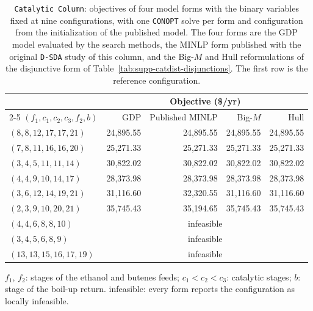 \begin{table}[htbp]
\centering
\caption{\texttt{Catalytic Column}: objectives of four model forms with the binary variables fixed at nine configurations, with one \texttt{CONOPT} solve per form and configuration from the initialization of the published model.
The four forms are the GDP model evaluated by the search methods, the MINLP form published with the original \texttt{D-SDA} study of this column, and the Big-\(M\) and Hull reformulations of the disjunctive form of Table~\ref{tab:supp-catdist-disjunctions}.
The first row is the reference configuration.}
\label{tab:supp-catdist-validation}
\footnotesize
\begin{threeparttable}
\begin{tabular}{@{}lrrrr@{}}\toprule
 & \multicolumn{4}{c}{Objective (\$/yr)}\\\cmidrule(l){2-5}
\((f_1,c_1,c_2,c_3,f_2,b)\) & GDP & Published MINLP & Big-\(M\) & Hull\\\midrule
\((8,8,12,17,17,21)\) & 24{,}895.55 & 24{,}895.55 & 24{,}895.55 & 24{,}895.55 \\
\((7,8,11,16,16,20)\) & 25{,}271.33 & 25{,}271.33 & 25{,}271.33 & 25{,}271.33 \\
\((3,4,5,11,11,14)\) & 30{,}822.02 & 30{,}822.02 & 30{,}822.02 & 30{,}822.02 \\
\((4,4,9,10,14,17)\) & 28{,}373.98 & 28{,}373.98 & 28{,}373.98 & 28{,}373.98 \\
\((3,6,12,14,19,21)\) & 31{,}116.60 & 32{,}320.55 & 31{,}116.60 & 31{,}116.60 \\
\((2,3,9,10,20,21)\) & 35{,}745.43 & 35{,}194.65 & 35{,}745.43 & 35{,}745.43 \\
\((4,4,6,8,8,10)\) & \multicolumn{4}{c}{infeasible} \\
\((3,4,5,6,8,9)\) & \multicolumn{4}{c}{infeasible} \\
\((13,13,15,16,17,19)\) & \multicolumn{4}{c}{infeasible} \\
\bottomrule
\end{tabular}
\begin{tablenotes}[flushleft]\footnotesize
\item \(f_1\), \(f_2\): stages of the ethanol and butenes feeds; \(c_1<c_2<c_3\): catalytic stages; \(b\): stage of the boil-up return.
infeasible: every form reports the configuration as locally infeasible.
\end{tablenotes}
\end{threeparttable}
\end{table}

